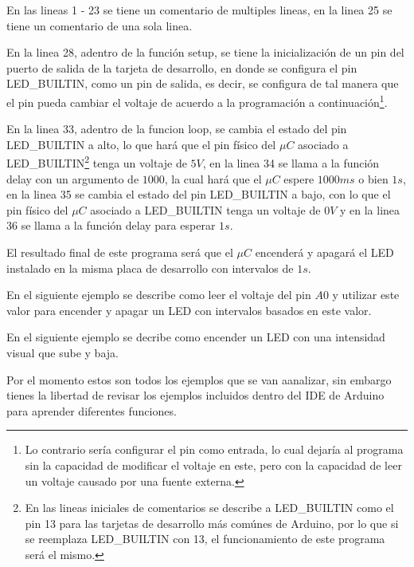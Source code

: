 		

		En las lineas 1 - 23 se tiene un comentario de multiples lineas, en la linea 25 se tiene un comentario de una sola linea.

		En la linea 28, adentro de la función setup, se tiene la inicialización de un pin del puerto de salida de la tarjeta de desarrollo, en donde se configura el pin LED\_BUILTIN, como un pin de salida, es decir, se configura de tal manera que el pin pueda cambiar el voltaje de acuerdo a la programación a continuación\footnote{Lo contrario sería configurar el pin como entrada, lo cual dejaría al programa sin la capacidad de modificar el voltaje en este, pero con la capacidad de leer un voltaje causado por una fuente externa.}.

		En la linea 33, adentro de la funcion loop, se cambia el estado del pin LED\_BUILTIN a alto, lo que hará que el pin físico del $\mu C$ asociado a LED\_BUILTIN\footnote{En las lineas iniciales de comentarios se describe a LED\_BUILTIN como el pin 13 para las tarjetas de desarrollo más comúnes de Arduino, por lo que si se reemplaza LED\_BUILTIN con 13, el funcionamiento de este programa será el mismo.} tenga un voltaje de $5V$, en la linea 34 se llama a la función delay con un argumento de $1000$, la cual hará que el $\mu C$ espere $1000 ms$ o bien $1s$, en la linea 35 se cambia el estado del pin LED\_BUILTIN a bajo, con lo que el pin físico del $\mu C$ asociado a LED\_BUILTIN tenga un voltaje de $0V$ y en la linea 36 se llama a la función delay para esperar $1s$.

		El resultado final de este programa será que el $\mu C$ encenderá y apagará el LED instalado en la misma placa de desarrollo con intervalos de $1s$.

		En el siguiente ejemplo se describe como leer el voltaje del pin $A0$ y utilizar este valor para encender y apagar un LED con intervalos basados en este valor.
		

		En el siguiente ejemplo se decribe como encender un LED con una intensidad visual que sube y baja.
		

		Por el momento estos son todos los ejemplos que se van aanalizar, sin embargo tienes la libertad de revisar los ejemplos incluidos dentro del IDE de Arduino para aprender diferentes funciones.




